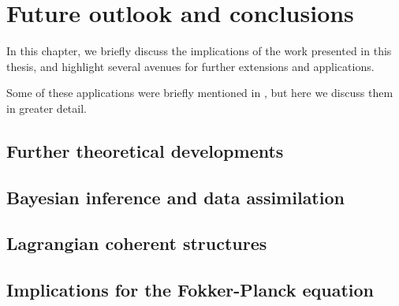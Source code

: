 \chapter{Future outlook and conclusions}
In this chapter, we briefly discuss the implications of the work presented in this thesis, and highlight several avenues for further extensions and applications.

Some of these applications were briefly mentioned in , but here we discuss them in greater detail.

\section{Further theoretical developments}


\section{Bayesian inference and data assimilation}


\section{Lagrangian coherent structures}




\citet{BadzaEtAl_2023_HowSensitiveAre}



\section{Implications for the Fokker-Planck equation}
